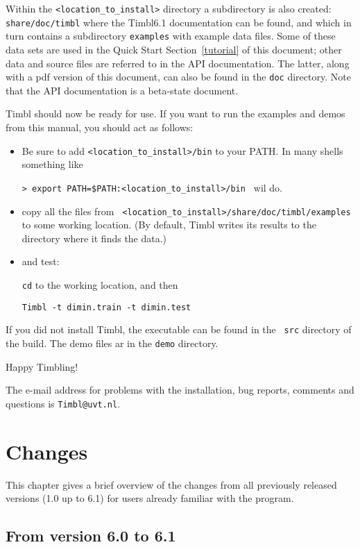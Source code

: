 \documentclass{report}
\begin{document}
Within the {\tt <location\_to\_install>} directory a subdirectory is
also created: {\tt share/doc/timbl} where the Timbl6.1 documentation
can be found, and which in turn contains a subdirectory {\tt examples}
with example data files. Some of these data sets are used in the Quick
Start Section~\ref{tutorial} of this document; other data and source
files are referred to in the API documentation. The latter, along with
a pdf version of this document, can also be found in the {\tt doc}
directory. Note that the API documentation is a beta-state document.

Timbl should now be ready for use. If you want to run the examples and
demos from this manual, you should act as follows:

\begin{itemize}
\item Be sure to add {\tt <location\_to\_install>/bin} to your PATH. 
In many shells something like

 {\tt > export PATH=\$PATH:<location\_to\_install>/bin }
wil do.
\item copy all the files from {\tt
  <location\_to\_install>/share/doc/timbl/examples} to some working
location. (By default, Timbl writes its results to the directory where
it finds the data.)
\item and test:

{\tt cd} to the working location, and then

{\tt Timbl -t dimin.train -t dimin.test}
\end{itemize}

If you did not install Timbl, the executable can be found in the {\tt
  src} directory of the build. The demo files ar in the {\tt demo}
directory.

Happy Timbling!

The e-mail address for problems with the installation, bug reports,
comments and questions is {\tt Timbl@uvt.nl}.

\chapter{Changes}
\label{changes}

This chapter gives a brief overview of the changes from all previously
released versions (1.0 up to 6.1) for users already familiar with the
program.

\section{From version 6.0 to 6.1}
\end{document}
